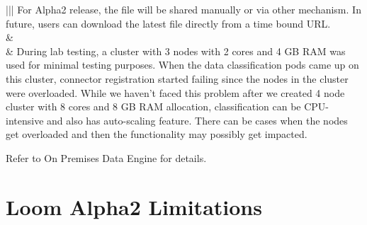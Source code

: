 \documentclass[letterpaper,10pt,english]{sphinxhowto}
\begin{document}
\begin{savenotes}
\begin{longtable}{|||}
For Alpha2 release, the file will be shared manually or via other mechanism.
In future, users can download the latest file directly from a time bound URL.
\\
\hline{}%
&
\\
&
During lab testing, a cluster with 3 nodes with 2 cores and 4 GB RAM was used for
minimal testing purposes. When the data classification pods came up on this cluster,
connector registration started failing since the nodes in the cluster were
overloaded. While we haven’t faced this problem after we created 4 node cluster with
8 cores and 8 GB RAM allocation, classification can be CPU-intensive and also has
auto-scaling feature. There can be cases when the nodes get overloaded and then the
functionality may possibly get impacted.

 Refer to On Premises Data Engine  for details.
\\
\hline
\end{longtable}\sphinxatlongtableend\end{savenotes}


\section{Loom Alpha2  Limitations}
\label{\detokenize{relnotes/rn-loom-alpha2:loom-alpha2-limitations}}
\end{document}
